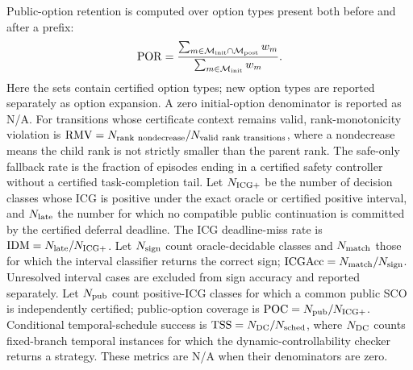 \documentclass[letterpaper]{article} %
\begin{document}
Public-option retention is computed over option types present both before and after a prefix:
\begin{equation}
\mathrm{POR}=
\frac{\sum_{m\in\mathcal M_{\rm init}\cap\mathcal M_{\rm post}}w_m}
{\sum_{m\in\mathcal M_{\rm init}}w_m}.
\label{eq:por}
\end{equation}
Here the sets contain certified option types; new option types are reported separately as option expansion. A zero initial-option denominator is reported as N/A. For transitions whose certificate context remains valid, rank-monotonicity violation is $\mathrm{RMV}=N_{\rm rank\ nondecrease}/N_{\rm valid\ rank\ transitions}$, where a nondecrease means the child rank is not strictly smaller than the parent rank. The safe-only fallback rate is the fraction of episodes ending in a certified safety controller without a certified task-completion tail. Let $N_{\rm ICG+}$ be the number of decision classes whose ICG is positive under the exact oracle or certified positive interval, and $N_{\rm late}$ the number for which no compatible public continuation is committed by the certified deferral deadline. The ICG deadline-miss rate is $\mathrm{IDM}=N_{\rm late}/N_{\rm ICG+}$. Let $N_{\rm sign}$ count oracle-decidable classes and $N_{\rm match}$ those for which the interval classifier returns the correct sign; $\mathrm{ICGAcc}=N_{\rm match}/N_{\rm sign}$. Unresolved interval cases are excluded from sign accuracy and reported separately. Let $N_{\rm pub}$ count positive-ICG classes for which a common public SCO is independently certified; public-option coverage is $\mathrm{POC}=N_{\rm pub}/N_{\rm ICG+}$. Conditional temporal-schedule success is $\mathrm{TSS}=N_{\rm DC}/N_{\rm sched}$, where $N_{\rm DC}$ counts fixed-branch temporal instances for which the dynamic-controllability checker returns a strategy. These metrics are N/A when their denominators are zero.
\end{document}
